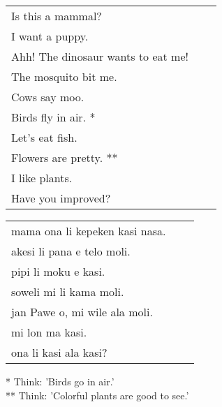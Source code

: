 \begin{supertabular}{p{5,5cm}|ll}
Is this a mammal? &&  \\ %
I want a puppy. &&   \\ %
Ahh! The dinosaur wants to eat me!  &&  \\ %
The mosquito bit me.  &&  \\ %
Cows say moo.  &&  \\ %
Birds fly in air. * &&  \\ %
Let's eat fish.  &&  \\ %
Flowers are pretty. ** &&  \\ %
I like plants. &&   \\ %
Have you improved? &&  \\ %
\end{supertabular}

\begin{supertabular}{p{5,5cm}|ll}
mama ona li kepeken kasi nasa.  &&  \\ %
akesi li pana e telo moli. &&  \\  %
pipi li moku e kasi.  &&  \\ %
soweli mi li kama moli.  &&  \\ %
jan Pawe o, mi wile ala moli. && \\   %
mi lon ma kasi. &&   \\ %
ona li kasi ala kasi? &&   \\ %
\end{supertabular} 

* Think: 'Birds go in air.' \\
** Think: 'Colorful plants are good to see.' 
